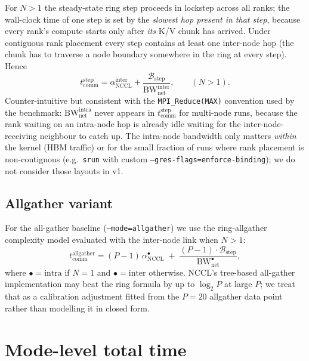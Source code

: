 \documentclass[11pt]{article}
\newcommand{\bw}{\mathrm{BW}}
\newcommand{\comm}{\mathrm{comm}}
\newcommand{\step}{\mathrm{step}}
\begin{document}
For $N > 1$ the steady-state ring step proceeds in lockstep across all
ranks; the wall-clock time of one step is set by the \emph{slowest hop
present in that step}, because every rank's compute starts only after
\emph{its} K/V chunk has arrived. Under contiguous rank placement
every step contains at least one inter-node hop (the chunk has to
traverse a node boundary somewhere in the ring at every step). Hence
\begin{equation}
  \boxed{\;
    t_\comm^\step
    = \alpha_{\text{NCCL}}^{\text{inter}}
      + \frac{\mathcal{B}_\step}{\bw_{\text{net}}^{\text{inter}}} ,
    \qquad (N > 1).
  \;}
  \label{eq:tcomm_step_inter}
\end{equation}
Counter-intuitive but consistent with the
\texttt{MPI\_Reduce(MAX)} convention used by the benchmark:
$\bw_{\text{net}}^{\text{intra}}$ never appears in
$t_\comm^\step$ for multi-node runs, because the rank waiting on an
intra-node hop is already idle waiting for the inter-node-receiving
neighbour to catch up. The intra-node bandwidth only matters
\emph{within} the kernel (HBM traffic) or for the small fraction of
runs where rank placement is non-contiguous (e.g.~\texttt{srun} with
custom \texttt{--gres-flags=enforce-binding}); we do not consider
those layouts in v1.

\subsection{Allgather variant}

For the all-gather baseline (\texttt{--mode=allgather}) we use the
ring-allgather complexity model evaluated with the inter-node link
when $N > 1$:
\begin{equation}
  t_\comm^{\text{allgather}}
  = (P - 1)\,\alpha_{\text{NCCL}}^{\bullet} \;+\;
    \frac{(P-1) \cdot \mathcal{B}_\step}{\bw_{\text{net}}^{\bullet}} ,
  \label{eq:tcomm_allgather}
\end{equation}
where $\bullet = \text{intra}$ if $N = 1$ and $\bullet = \text{inter}$
otherwise. NCCL's tree-based all-gather implementation may beat the
ring formula by up to $\log_2 P$ at large $P$; we treat that as a
calibration adjustment fitted from the $P=20$ allgather data point
rather than modelling it in closed form.

\section{Mode-level total time}
\label{sec:modes}
\end{document}
